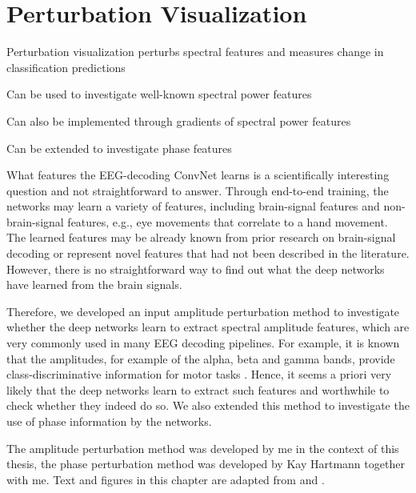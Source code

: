 \chapter{Perturbation Visualization}\label{perturbation-visualization}

\begin{startbox}{Perturbation visualization perturbs spectral features and measures change in classification predictions}
\item Can be used to investigate well-known spectral power features
\item Can also be implemented through gradients of spectral power features
\item Can be extended to investigate phase features
\end{startbox}


    What features the EEG-decoding ConvNet learns is a scientifically
interesting question and not straightforward to answer. Through
end-to-end training, the networks may learn a variety of features,
including brain-signal features and non-brain-signal features, e.g., eye
movements that correlate to a hand movement. The learned features may be
already known from prior research on brain-signal decoding or represent
novel features that had not been described in the literature. However,
there is no straightforward way to find out what the deep networks have
learned from the brain signals.

    Therefore, we developed an input amplitude perturbation method to
investigate whether the deep networks learn to extract spectral
amplitude features, which are very commonly used in many EEG decoding
pipelines. For example, it is known that the amplitudes, for example of
the alpha, beta and gamma bands, provide class-discriminative
information for motor tasks
\citep{ball_movement_2008,pfurtscheller_evaluation_1979,pfurtscheller_central_1981}.
Hence, it seems a priori very likely that the deep networks learn to
extract such features and worthwhile to check whether they indeed do so.
We also extended this method to investigate the use of phase information
by the networks.

The amplitude perturbation method was developed by me in the context of
this thesis, the phase perturbation method was developed by Kay Hartmann
together with me. Text and figures in this chapter are adapted from
\citep{schirrmeisterdeephbm2017} and \citep{hartmann2018hierarchical}.



